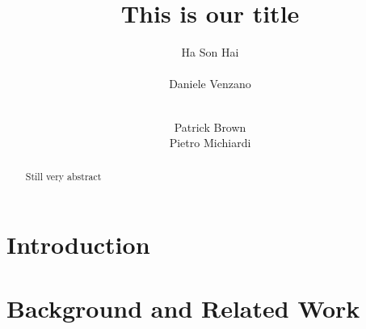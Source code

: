 \documentclass{acmsig}
\begin{document}
\title{This is our title}


\author{
\alignauthor
Ha Son Hai\\
       \\
\alignauthor
Daniele Venzano\\
       \\
\and
\alignauthor 
Patrick Brown
       \\
\alignauthor 
Pietro Michiardi
       \\
}

\maketitle


\begin{abstract}
Still very abstract
\end{abstract}

\section{Introduction}

\section{Background and Related Work}

\end{document}
